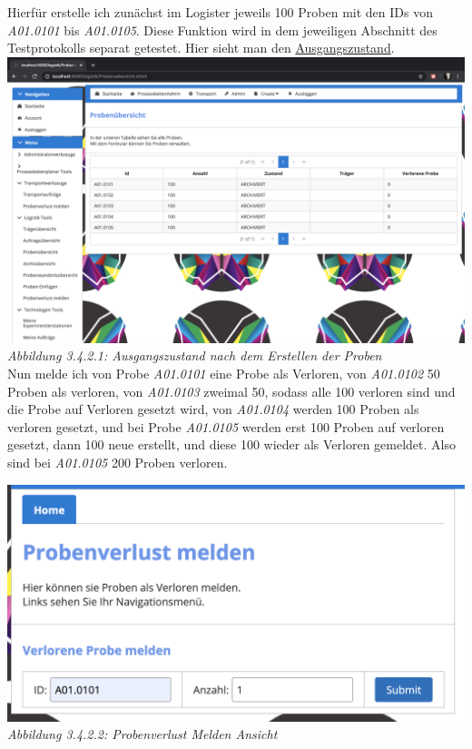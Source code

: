 \documentclass[enabledeprecatedfontcommands,fontsize=12pt,paper=a4,twoside]{scrartcl}
\begin{document}
Hierfür erstelle ich zunächst im Logister jeweils 100 Proben mit den IDs von \textit{A01.0101} bis \textit{A01.0105}. Diese Funktion wird in dem jeweiligen Abschnitt des Testprotokolls separat getestet. Hier sieht man den \hyperlink{sc3.4.2.1}{Ausgangszustand}. \\

\hypertarget{sc3.4.2.1}{
\includegraphics[width=1\textwidth]{Screenshots/3421.png}
\textit{Abbildung 3.4.2.1: Ausgangszustand nach dem Erstellen der Proben}
} \\

Nun melde ich von Probe \textit{A01.0101} eine Probe als Verloren, von \textit{A01.0102} 50 Proben als verloren, von \textit{A01.0103} zweimal 50, sodass alle 100 verloren sind und die Probe auf Verloren gesetzt wird, von \textit{A01.0104} werden 100 Proben als verloren gesetzt, und bei Probe \textit{A01.0105} werden erst 100 Proben auf verloren gesetzt, dann 100 neue erstellt, und diese 100 wieder als Verloren gemeldet. Also sind bei \textit{A01.0105} 200 Proben verloren. 

\hypertarget{sc3.4.2.2}{
\includegraphics[width=1\textwidth]{Screenshots/3422.png}
\textit{Abbildung 3.4.2.2: Probenverlust Melden Ansicht}
} \\
\end{document}
